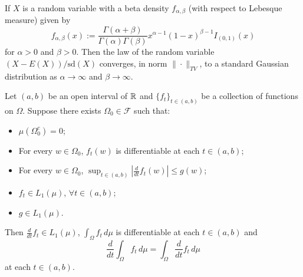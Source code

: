 \begin{corollary}
If $X$ is a random variable with a beta density $f_{\alpha, \beta}$ (with respect to Lebesque measure) given by
\[f_{\alpha,\beta}(x):=\frac{\Gamma (\alpha+\beta)}{\Gamma(\alpha)\Gamma(\beta)} x^{\alpha-1}(1-x)^{\beta-1}I_{(0,1)}(x) \]
for $\alpha>0$ and $\beta>0$.
Then the law  of the random variable $(X - E(X))/\text{sd}(X)$ converges, in  norm $\| \cdot \|_{TV}$, to a standard Gaussian distribution as $\alpha\rightarrow\infty$ and $\beta\rightarrow\infty$.
\end{corollary}


\begin{theorem}
Let $(a,b)$ be an open interval of $\Bbb R$ and
 $\{f_t\}_{t\in(a,b)}$ be a collection of  functions on $\Omega$. Suppose  there exists $\Omega_0\in \mathcal F$  such that:
 \begin{itemize}
\item $\mu(\Omega_0^c)=0$;
\item For every $w\in\Omega_0$, $f_t(w)$ is  differentiable at each $t\in (a,b)$;
\item  For every $w\in \Omega_0$, $\sup_{t\in(a,b)}\left |\frac{d}{dt} f_t(w)\right|\leq g(w)$;
\item $f_t\in  L_1(\mu)$,  $\forall t\in(a,b)$;
\item $g\in L_1(\mu)$.
\end{itemize}
Then $\frac{d}{dt} f_t \in L_1(\mu)$, $ \int_\Omega f_t \,d\mu$ is differentiable at each $t\in (a,b)$  and
\[ \frac{d}{dt} \int_\Omega\! f_t \, d\mu =  \int_\Omega \frac{d}{dt} f_t \, d\mu\]
at each $t\in(a,b)$.
\end{theorem}

%





